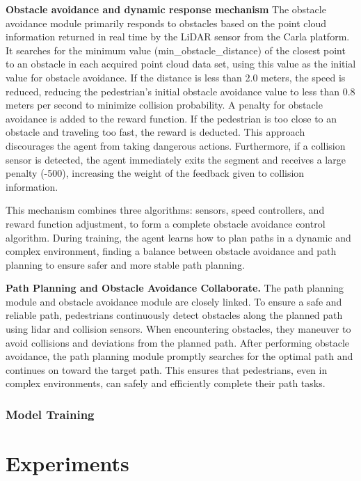 \documentclass[lettersize,journal]{IEEEtran}
\begin{document}
\textbf{Obstacle avoidance and dynamic response mechanism}
The obstacle avoidance module primarily responds to obstacles based on the point cloud information returned in real time by the LiDAR sensor from the Carla platform. 
It searches for the minimum value (min\_obstacle\_distance) of the closest point to an obstacle in each acquired point cloud data set, using this value as the initial value for obstacle avoidance. 
If the distance is less than 2.0 meters, the speed is reduced, reducing the pedestrian's initial obstacle avoidance value to less than 0.8 meters per second to minimize collision probability. 
A penalty for obstacle avoidance is added to the reward function. 
If the pedestrian is too close to an obstacle and traveling too fast, the reward is deducted. 
This approach discourages the agent from taking dangerous actions. 
Furthermore, if a collision sensor is detected, the agent immediately exits the segment and receives a large penalty (-500), increasing the weight of the feedback given to collision information.


This mechanism combines three algorithms: sensors, speed controllers, and reward function adjustment, to form a complete obstacle avoidance control algorithm. 
During training, the agent learns how to plan paths in a dynamic and complex environment, finding a balance between obstacle avoidance and path planning to ensure safer and more stable path planning.


\textbf{Path Planning and Obstacle Avoidance Collaborate.}
%
The path planning module and obstacle avoidance module are closely linked. 
To ensure a safe and reliable path, pedestrians continuously detect obstacles along the planned path using lidar and collision sensors. 
When encountering obstacles, they maneuver to avoid collisions and deviations from the planned path. 
After performing obstacle avoidance, the path planning module promptly searches for the optimal path and continues on toward the target path. 
This ensures that pedestrians, even in complex environments, can safely and efficiently complete their path tasks.


\subsubsection{Model Training}



\section{Experiments}
\end{document}
